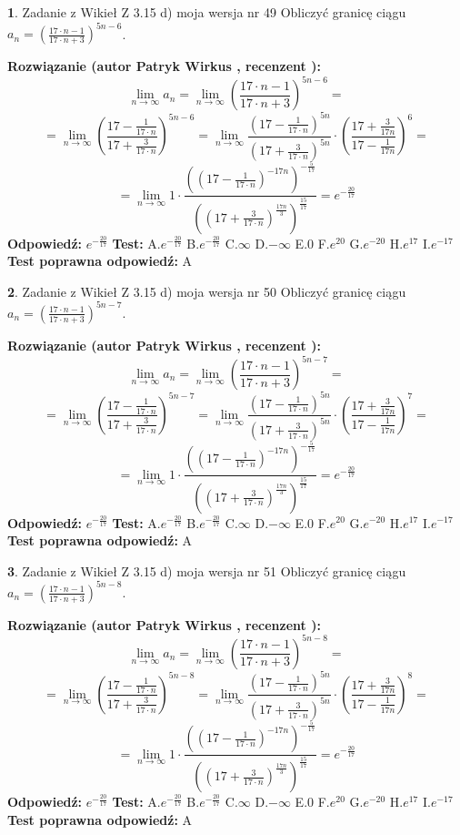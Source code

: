 \documentclass[12pt, a4paper]{article}
\theoremstyle{definition} %
\newtheorem{zad}{}
\newcommand{\zadStart}[1]{\begin{zad}#1\newline}
\newcommand{\zadStop}{\end{zad}}
\newcommand{\rozwStart}[2]{\noindent \textbf{Rozwiązanie (autor #1 , recenzent #2): }\newline}
\newcommand{\rozwStop}{\newline}
\newcommand{\odpStart}{\noindent \textbf{Odpowiedź:}\newline}
\newcommand{\odpStop}{\newline}
\newcommand{\testStart}{\noindent \textbf{Test:}\newline}
\newcommand{\testStop}{\newline}
\newcommand{\kluczStart}{\noindent \textbf{Test poprawna odpowiedź:}\newline}
\newcommand{\kluczStop}{\newline}
\begin{document}
\zadStart{Zadanie z Wikieł Z 3.15 d) moja wersja nr 49}
Obliczyć granicę ciągu $a_{n}=(\frac{17\cdot n - 1}{17 \cdot n + 3})^{5n-6}$.
\zadStop
\rozwStart{Patryk Wirkus}{}
$$\lim\limits_{n\to\infty} a_{n} = \lim\limits_{n\to\infty}(\frac{17\cdot n - 1}{17 \cdot n + 3})^{5n-6}=$$
$$=\lim\limits_{n\to\infty}(\frac{17 - \frac{1}{17\cdot n}}{17 + \frac{3}{17 \cdot n}})^{5n-6}=\lim\limits_{n\to\infty}\frac{(17 - \frac{1}{17\cdot n})^{5n}}{(17 + \frac{3}{17\cdot n})^{5n}} \cdot (\frac{17+\frac{3}{17n}}{17-\frac{1}{17n}})^{6}=$$
$$=\lim\limits_{n\to\infty} 1 \cdot \frac{((17-\frac{1}{17 \cdot n})^{-17n})^{-\frac{5}{17}}}{((17+\frac{3}{17 \cdot n})^{\frac{17n}{3}})^{\frac{15}{17}}} =e^{-\frac{20}{17}}$$
\rozwStop
\odpStart
$e^{-\frac{20}{17}}$
\odpStop
\testStart
A.$ e^{-\frac{20}{17}}$
B.$ e^{-\frac{20}{17}}$
C.$\infty$
D.$-\infty$
E.$0$
F.$e^{20}$
G.$e^{-20}$
H.$e^{17}$
I.$e^{-17}$
\testStop
\kluczStart
A
\kluczStop



\zadStart{Zadanie z Wikieł Z 3.15 d) moja wersja nr 50}
Obliczyć granicę ciągu $a_{n}=(\frac{17\cdot n - 1}{17 \cdot n + 3})^{5n-7}$.
\zadStop
\rozwStart{Patryk Wirkus}{}
$$\lim\limits_{n\to\infty} a_{n} = \lim\limits_{n\to\infty}(\frac{17\cdot n - 1}{17 \cdot n + 3})^{5n-7}=$$
$$=\lim\limits_{n\to\infty}(\frac{17 - \frac{1}{17\cdot n}}{17 + \frac{3}{17 \cdot n}})^{5n-7}=\lim\limits_{n\to\infty}\frac{(17 - \frac{1}{17\cdot n})^{5n}}{(17 + \frac{3}{17\cdot n})^{5n}} \cdot (\frac{17+\frac{3}{17n}}{17-\frac{1}{17n}})^{7}=$$
$$=\lim\limits_{n\to\infty} 1 \cdot \frac{((17-\frac{1}{17 \cdot n})^{-17n})^{-\frac{5}{17}}}{((17+\frac{3}{17 \cdot n})^{\frac{17n}{3}})^{\frac{15}{17}}} =e^{-\frac{20}{17}}$$
\rozwStop
\odpStart
$e^{-\frac{20}{17}}$
\odpStop
\testStart
A.$ e^{-\frac{20}{17}}$
B.$ e^{-\frac{20}{17}}$
C.$\infty$
D.$-\infty$
E.$0$
F.$e^{20}$
G.$e^{-20}$
H.$e^{17}$
I.$e^{-17}$
\testStop
\kluczStart
A
\kluczStop



\zadStart{Zadanie z Wikieł Z 3.15 d) moja wersja nr 51}
Obliczyć granicę ciągu $a_{n}=(\frac{17\cdot n - 1}{17 \cdot n + 3})^{5n-8}$.
\zadStop
\rozwStart{Patryk Wirkus}{}
$$\lim\limits_{n\to\infty} a_{n} = \lim\limits_{n\to\infty}(\frac{17\cdot n - 1}{17 \cdot n + 3})^{5n-8}=$$
$$=\lim\limits_{n\to\infty}(\frac{17 - \frac{1}{17\cdot n}}{17 + \frac{3}{17 \cdot n}})^{5n-8}=\lim\limits_{n\to\infty}\frac{(17 - \frac{1}{17\cdot n})^{5n}}{(17 + \frac{3}{17\cdot n})^{5n}} \cdot (\frac{17+\frac{3}{17n}}{17-\frac{1}{17n}})^{8}=$$
$$=\lim\limits_{n\to\infty} 1 \cdot \frac{((17-\frac{1}{17 \cdot n})^{-17n})^{-\frac{5}{17}}}{((17+\frac{3}{17 \cdot n})^{\frac{17n}{3}})^{\frac{15}{17}}} =e^{-\frac{20}{17}}$$
\rozwStop
\odpStart
$e^{-\frac{20}{17}}$
\odpStop
\testStart
A.$ e^{-\frac{20}{17}}$
B.$ e^{-\frac{20}{17}}$
C.$\infty$
D.$-\infty$
E.$0$
F.$e^{20}$
G.$e^{-20}$
H.$e^{17}$
I.$e^{-17}$
\testStop
\kluczStart
A
\kluczStop
\end{document}

